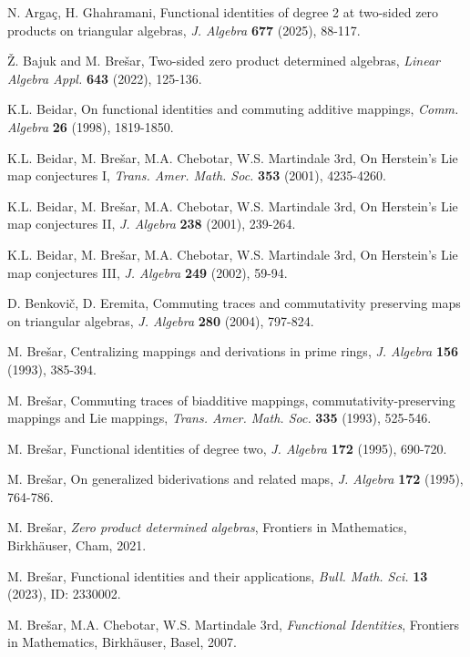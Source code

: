 \documentclass[reqno]{amsart}
\numberwithin{equation}{section}
\theoremstyle{plain}
\theoremstyle{definition}
\begin{document}
\begin{thebibliography}{}

 N. Arga\c{c}, H. Ghahramani,
Functional identities of degree 2 at two-sided zero products on triangular algebras,
{\em J. Algebra} {\bf 677} (2025), 88-117.

 \v{Z}. Bajuk and M. Bre\v{s}ar, Two-sided zero product determined algebras,
{\em Linear Algebra Appl.} {\bf 643} (2022), 125-136.

 K.L. Beidar, On functional identities and commuting additive mappings,
{\em Comm. Algebra} {\bf 26} (1998), 1819-1850.

 K.L. Beidar, M. Bre\v{s}ar, M.A. Chebotar, W.S. Martindale 3rd, On Herstein's Lie map conjectures I,
{\em Trans. Amer. Math. Soc.} {\bf 353} (2001), 4235-4260.

 K.L. Beidar, M. Bre\v{s}ar, M.A. Chebotar, W.S. Martindale 3rd, On Herstein's Lie map conjectures II,
{\em J. Algebra} {\bf 238} (2001), 239-264.

 K.L. Beidar, M. Bre\v{s}ar, M.A. Chebotar, W.S. Martindale 3rd, On Herstein's Lie map conjectures III,
{\em J. Algebra} {\bf 249} (2002), 59-94.

 D. Benkovi\v{c}, D. Eremita, Commuting traces and commutativity preserving maps on triangular algebras,
{\em J. Algebra} {\bf 280} (2004), 797-824.

 M. Bre\v{s}ar, Centralizing mappings and derivations in prime rings,
{\em J. Algebra} {\bf 156} (1993), 385-394.

 M. Bre\v{s}ar, Commuting traces of biadditive mappings, commutativity-preserving
mappings and Lie mappings, {\em Trans. Amer. Math. Soc.} {\bf 335} (1993), 525-546.

 M. Bre\v{s}ar, Functional identities of degree two,
{\em J. Algebra} {\bf 172} (1995), 690-720.

 M. Bre\v{s}ar, On generalized biderivations and related maps,
{\em J. Algebra} {\bf 172} (1995), 764-786.

 M. Bre\v{s}ar, \emph{Zero product determined algebras},
Frontiers in Mathematics, Birkh\"auser, Cham, 2021.

 M. Bre\v{s}ar, Functional identities and their applications,
{\em Bull. Math. Sci.} {\bf 13} (2023), ID: 2330002.

 M. Bre\v{s}ar, M.A. Chebotar, W.S. Martindale 3rd,
\emph{Functional Identities}, Frontiers in Mathematics, Birkh\"auser, Basel, 2007.


\end{thebibliography}
\end{document}
